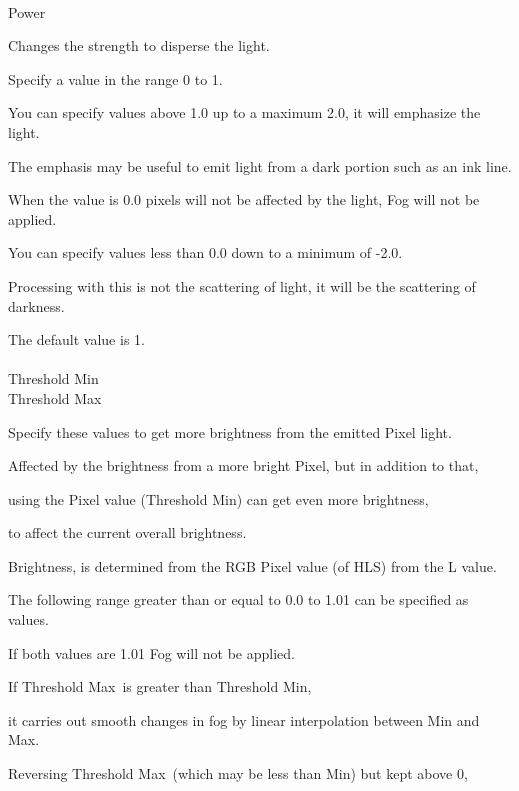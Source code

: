 \documentclass[a4paper,12pt]{article}
\begin{document}
\ \vspace{-0.2em}
\par
\noindent Power\par
Changes the strength to disperse the light.\par
Specify a value in the range 0 to 1.\par
You can specify values above 1.0 up to a maximum 2.0, it will emphasize the light.\par
The emphasis may be useful to emit light from a dark portion such as an ink line.\par
When the value is 0.0 pixels will not be affected by the light, Fog will not be applied.\par
You can specify values less than 0.0 down to a minimum of -2.0.\par
Processing with this is not the scattering of light, it will be the scattering of darkness.\par
The default value is 1.\\
\\
Threshold Min\\
Threshold Max\par
Specify these values to get more brightness from the emitted Pixel light.\\
\par
Affected by the brightness from a more bright Pixel, but in addition to that,\par
using the Pixel value (\textquotedbl Threshold Min\textquotedbl ) can get even more brightness,\par
to affect the current overall brightness.\par
Brightness, is determined from the RGB Pixel value (of HLS) from the L value.\\
\par
The following range greater than or equal to 0.0 to 1.01 can be specified as values.\\
\par
If both values are 1.01 Fog will not be applied.\\
\par
If \textquotedbl Threshold Max\textquotedbl \ is greater than \textquotedbl Threshold Min\textquotedbl ,\par
it carries out smooth changes in fog by linear interpolation between Min and Max.\\
\par
Reversing \textquotedbl Threshold Max\textquotedbl \ (which may be less than Min) but kept above 0,\par
\end{document}
